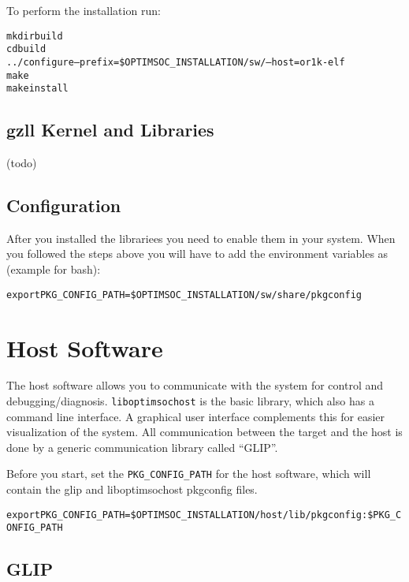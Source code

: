 
To perform the installation run:

\begin{alltt}
mkdir build
cd build
../configure --prefix=\$OPTIMSOC_INSTALLATION/sw/ --host=or1k-elf
make
make install
\end{alltt}

\subsection{gzll Kernel and Libraries}

(todo)

\subsection{Configuration}

After you installed the librariees you need to enable them in your
system. When you followed the steps above you will have to add the
environment variables as (example for bash):

\begin{alltt}
export PKG_CONFIG_PATH=\$OPTIMSOC_INSTALLATION/sw/share/pkgconfig
\end{alltt}

\section{Host Software}

The host software allows you to communicate with the system for
control and debugging/diagnosis. \verb|liboptimsochost| is the basic
library, which also has a command line interface. A graphical user
interface complements this for easier visualization of the system. All
communication between the target and the host is done by a generic communication
library called ``GLIP''.

Before you start, set the \verb|PKG_CONFIG_PATH| for the host software, which
will contain the glip and liboptimsochost pkgconfig files.

\begin{alltt}
export PKG_CONFIG_PATH=\$OPTIMSOC_INSTALLATION/host/lib/pkgconfig:\$PKG_CONFIG_PATH
\end{alltt}

\subsection{GLIP}

